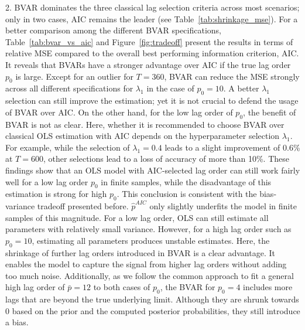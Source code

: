 \documentclass[12pt, a4paper]{article}
\begin{document}


2. BVAR dominates the three classical lag selection criteria across most scenarios; only in two cases, AIC remains the leader (see Table~\ref{tab:shrinkage_mse}). For a better comparison among the different BVAR specifications, Table~\ref{tab:bvar_vs_aic} and Figure~\ref{fig:tradeoff} present the results in terms of relative MSE compared to the overall best performing information criterion, AIC. It reveals that BVARs have a stronger advantage over AIC if the true lag order $p_0$ is large. Except for an outlier for $T=360$, BVAR can reduce the MSE strongly across all different specifications for $\lambda_1$ in the case of $p_0=10$. A better $\lambda_1$ selection can still improve the estimation; yet it is not crucial to defend the usage of BVAR over AIC. On the other hand, for the low lag order of $p_0$, the benefit of BVAR is not as clear. Here, whether it is recommended to choose BVAR over classical OLS estimation with AIC depends on the hyperparameter selection $\lambda_1$. For example, while the selection of $\lambda_1=0.4$ leads to a slight improvement of 0.6\% at $T=600$, other selections lead to a loss of accuracy of more than 10\%. These findings show that an OLS model with AIC-selected lag order can still work fairly well for a low lag order $p_0$ in finite samples, while the disadvantage of this estimation is strong for high $p_0$. This conclusion is consistent with the bias-variance tradeoff presented before. $\hat p^{AIC}$ only slightly underfits the model in finite samples of this magnitude. For a low lag order, OLS can still estimate all parameters with relatively small variance. However, for a high lag order such as $p_0=10$, estimating all parameters produces unstable estimates. Here, the shrinkage of further lag orders introduced in BVAR is a clear advantage. It enables the model to capture the signal from higher lag orders without adding too much noise. Additionally, as we follow the common approach to fit a general high lag order of $\bar p =12$ to both cases of $p_0$, the BVAR for $p_0=4$ includes more lags that are beyond the true underlying limit. Although they are shrunk towards 0 based on the prior and the computed posterior probabilities, they still introduce a bias.
\end{document}
